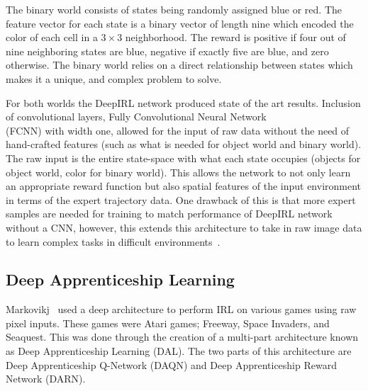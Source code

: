 \documentclass[12pt,american]{report}
\begin{document}
The binary world consists of states being randomly assigned blue or red.  The feature vector for each state is a binary vector of length nine which encoded the color of each cell in a $3\times 3$ neighborhood. The reward is positive if four out of nine neighboring states are blue, negative if exactly five are blue, and zero otherwise.  The binary world relies on a direct relationship between states which makes it a unique, and complex problem to solve. 

For both worlds the DeepIRL network produced state of the art results. Inclusion of convolutional layers, Fully Convolutional Neural Network \\(FCNN) with width one, allowed for the input of raw data without the need of hand-crafted features (such as what is needed for object world and binary world). The raw input is the entire state-space with what each state occupies (objects for object world, color for binary world). This allows the network to not only learn an appropriate reward function but also spatial features of the input environment in terms of the expert trajectory data.  One drawback of this is that more expert samples are needed for training to match performance of DeepIRL network without a CNN, however, this extends this architecture to take in raw image data to learn complex tasks in difficult environments~\cite{wulfmeier2015maximum}.

\subsection{Deep Apprenticeship Learning}
\label{sec:DAL}
Markovikj~\cite{markovikj2014deep} used a deep architecture to perform IRL on various games using raw pixel inputs. These games were Atari games; Freeway, Space Invaders, and Seaquest. This was done through the creation of a multi-part architecture known as Deep Apprenticeship Learning (DAL). The two parts of this architecture are Deep Apprenticeship Q-Network (DAQN) and Deep Apprenticeship Reward Network (DARN).
\end{document}
